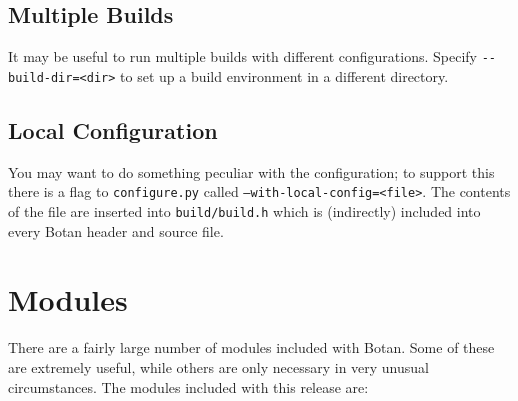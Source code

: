 \documentclass{article}
\newcommand{\filename}[1]{\texttt{#1}}
\begin{document}
\subsection{Multiple Builds}

It may be useful to run multiple builds with different
configurations. Specify \verb|--build-dir=<dir>| to set up a build
environment in a different directory.

\subsection{Local Configuration}

You may want to do something peculiar with the configuration; to
support this there is a flag to \filename{configure.py} called
\texttt{--with-local-config=<file>}. The contents of the file are
inserted into \filename{build/build.h} which is (indirectly) included
into every Botan header and source file.

\pagebreak

\section{Modules}

There are a fairly large number of modules included with Botan. Some
of these are extremely useful, while others are only necessary in very
unusual circumstances. The modules included with this release are:

\newcommand{\mod}[2]{\textbf{#1}: #2}
\end{document}
